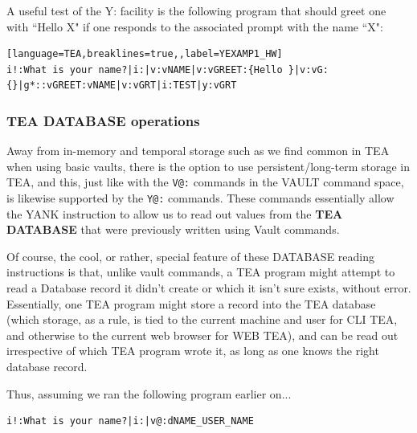 \documentclass[a4paper, 18pt]{book} %
\begin{document}
{{{\vspace{2em}


A useful test of the Y: facility is the following program that should greet one with ``Hello X" if one responds to the associated prompt with the name ``X":


\vspace{2em}
  \begin{tcolorbox}[teaterminalstyle, title=Y: EXAMPLE 1: Custom Greeting or Hello World, breakable]
  \begin{lstlisting}[language=TEA,breaklines=true,,label=YEXAMP1_HW]
i!:What is your name?|i:|v:vNAME|v:vGREET:{Hello }|v:vG:{}|g*::vGREET:vNAME|v:vGRT|i:TEST|y:vGRT
   \end{lstlisting}
  \end{tcolorbox}
\vspace{2em}


\subsubsection{TEA DATABASE operations}


Away from in-memory and temporal storage such as we find common in TEA when using basic vaults, there is the option to use persistent/long-term storage in TEA, and this, just like with the \texttt{V@:} commands in the VAULT command space, is likewise supported by the \texttt{Y@:} commands. These commands essentially allow the YANK instruction to allow us to read out values from the \textbf{TEA DATABASE} that were previously written using Vault commands.

\vspace{2em}

Of course, the cool, or rather, special feature of these DATABASE reading instructions is that, unlike vault commands, a TEA program might attempt to read a Database record it didn't create or which it isn't sure exists, without error. Essentially, one TEA program might store a record into the TEA database (which storage, as a rule, is tied to the current machine and user for CLI TEA, and otherwise to the current web browser for WEB TEA), and can be read out irrespective of which TEA program wrote it, as long as one knows the right database record.

\vspace{2em}

Thus, assuming we ran the following program earlier on...

\vspace{2em}
  \begin{tcolorbox}[teaterminalstyle, title=EXAMPLE 2: Saving a User's Name to the TEA DATABASE, breakable]
  \begin{lstlisting}[language=TEA,breaklines=true,]
i!:What is your name?|i:|v@:dNAME_USER_NAME
   \end{lstlisting}
  \end{tcolorbox}
\vspace{2em}


}}}
\end{document}

